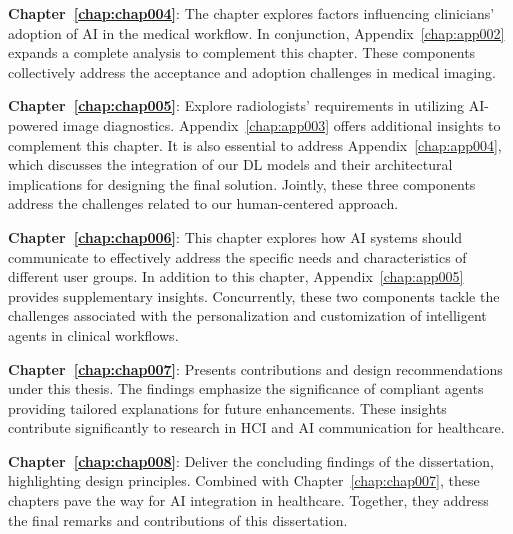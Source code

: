 \vspace{2.00mm}

\noindent
{\bf Chapter~\ref{chap:chap004}}:
The chapter explores factors influencing clinicians' adoption of \ac{AI} in the medical workflow.
In conjunction, Appendix~\ref{chap:app002} expands a complete analysis to complement this chapter.
These components collectively address the acceptance and adoption challenges in medical imaging.

\vspace{2.00mm}

\noindent
{\bf Chapter~\ref{chap:chap005}}:
Explore radiologists' requirements in utilizing \ac{AI}-powered image diagnostics.
Appendix~\ref{chap:app003} offers additional insights to complement this chapter.
It is also essential to address Appendix~\ref{chap:app004}, which discusses the integration of our \ac{DL} models and their architectural implications for designing the final solution.
Jointly, these three components address the challenges related to our human-centered approach.

\vspace{2.00mm}

\noindent
{\bf Chapter~\ref{chap:chap006}}: This chapter explores how \ac{AI} systems should communicate to effectively address the specific needs and characteristics of different user groups.
In addition to this chapter, Appendix~\ref{chap:app005} provides supplementary insights.
Concurrently, these two components tackle the challenges associated with the personalization and customization of intelligent agents in clinical workflows.

\vspace{2.00mm}

\noindent
{\bf Chapter~\ref{chap:chap007}}:
Presents contributions and design recommendations under this thesis.
The findings emphasize the significance of compliant agents providing tailored explanations for future enhancements.
These insights contribute significantly to research in \ac{HCI} and \ac{AI} communication for healthcare.

\vspace{2.00mm}

\noindent
{\bf Chapter~\ref{chap:chap008}}:
Deliver the concluding findings of the dissertation, highlighting design principles.
Combined with Chapter~\ref{chap:chap007}, these chapters pave the way for \ac{AI} integration in healthcare.
Together, they address the final remarks and contributions of this dissertation.

